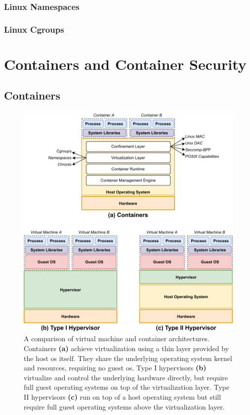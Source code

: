 \subsubsection*{Linux Namespaces}

\subsubsection*{Linux Cgroups}






\section{Containers and Container Security}%
\label{s:container-security-bg}

\subsection{Containers}%
\label{ss:containers-bg}

\begin{figure}[tbp]
  \centering
  \includegraphics[width=0.8\linewidth]{figs/background/virtualization.pdf}
  \caption[A comparison of virtual machine and container architectures]{
    A comparison of virtual machine and container architectures. Containers \textbf{(a)}
    achieve virtualization using a thin layer provided by the host \gls{os}
    itself. They share the underlying operating system kernel and resources, requiring no
    guest \gls{os}. Type I hypervisors \textbf{(b)} virtualize and control the
    underlying hardware directly, but require full guest operating systems on top of the
    virtualization layer. Type II hypervisors \textbf{(c)} run on top of a host operating
    system but still require full guest operating systems above the virtualization layer.
  }%
  \label{fig:virt}
\end{figure}

